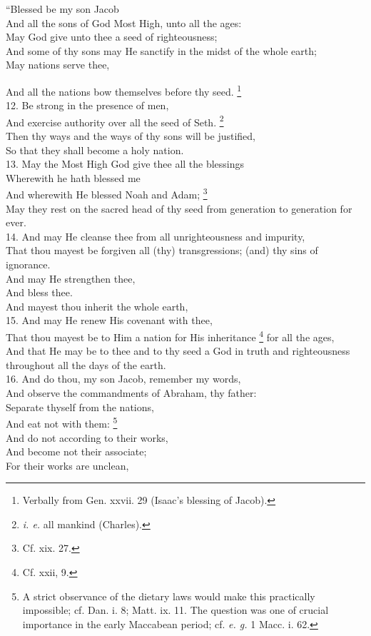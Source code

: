``Blessed be my son Jacob\\
And all the sons of God Most High, unto all the ages:\\
May God give unto thee a seed of righteousness;\\
And some of thy sons may He sanctify in the midst of the whole earth;\\
May nations serve thee,

And all the nations bow themselves before thy seed. \footnote{Verbally from Gen. xxvii. 29 (Isaac's blessing of Jacob).}\\
12. Be strong in the presence of men,\\
And exercise authority over all the seed of Seth. \footnote{\emph{i. e.} all mankind (Charles).}\\
Then thy ways and the ways of thy sons will be justified,\\
So that they shall become a holy nation.\\
13. May the Most High God give thee all the blessings\\
Wherewith he hath blessed me\\
And wherewith He blessed Noah and Adam; \footnote{Cf. xix. 27.}\\
May they rest on the sacred head of thy seed from generation to generation for ever.\\
14. And may He cleanse thee from all unrighteousness and impurity,\\
That thou mayest be forgiven all (thy) transgressions; (and) thy sins of ignorance.\\
And may He strengthen thee,\\
And bless thee.\\
And mayest thou inherit the whole earth,\\
15. And may He renew His covenant with thee,\\
That thou mayest be to Him a nation for His inheritance \footnote{Cf. xxii, 9.} for all the ages,\\
And that He may be to thee and to thy seed a God in truth and righteousness throughout all the days of the earth.\\
16. And do thou, my son Jacob, remember my words,\\
And observe the commandments of Abraham, thy father:\\
Separate thyself from the nations,\\
And eat not with them: \footnote{A strict observance of the dietary laws would make this practically impossible; cf. Dan. i. 8; Matt. ix. 11. The question was one of crucial importance in the early Maccabean period; cf. \emph{e. g.} 1 Macc. i. 62.}\\
And do not according to their works,\\
And become not their associate;\\
For their works are unclean,

